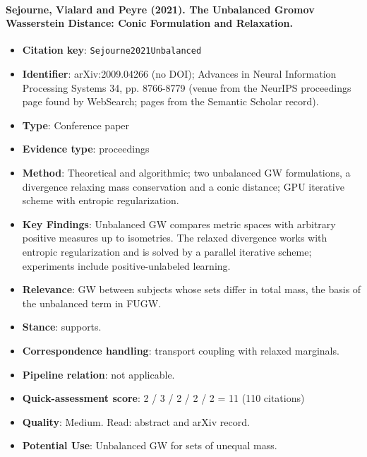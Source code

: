 \documentclass[journal,onecolumn]{IEEEtran}
\begin{document}
\paragraph{Sejourne, Vialard and Peyre (2021). The Unbalanced Gromov Wasserstein Distance: Conic Formulation and Relaxation.~\cite{Sejourne2021Unbalanced}}\mbox{}

\begin{itemize}

\item{} \textbf{Citation key}: \texttt{Sejourne2021Unbalanced}

\item{} \textbf{Identifier}: arXiv:2009.04266 (no DOI); Advances in Neural Information Processing Systems 34, pp. 8766-8779 (venue from the NeurIPS proceedings page found by WebSearch; pages from the Semantic Scholar record).

\item{} \textbf{Type}: Conference paper

\item{} \textbf{Evidence type}: proceedings

\item{} \textbf{Method}: Theoretical and algorithmic; two unbalanced GW formulations, a divergence relaxing mass conservation and a conic distance; GPU iterative scheme with entropic regularization.

\item{} \textbf{Key Findings}: Unbalanced GW compares metric spaces with arbitrary positive measures up to isometries. The relaxed divergence works with entropic regularization and is solved by a parallel iterative scheme; experiments include positive-unlabeled learning.

\item{} \textbf{Relevance}: GW between subjects whose sets differ in total mass, the basis of the unbalanced term in FUGW.

\item{} \textbf{Stance}: supports.

\item{} \textbf{Correspondence handling}: transport coupling with relaxed marginals.

\item{} \textbf{Pipeline relation}: not applicable.

\item{} \textbf{Quick-assessment score}: 2 / 3 / 2 / 2 / 2 = 11 (110 citations)

\item{} \textbf{Quality}: Medium. Read: abstract and arXiv record.

\item{} \textbf{Potential Use}: Unbalanced GW for sets of unequal mass.

\end{itemize}
\end{document}
